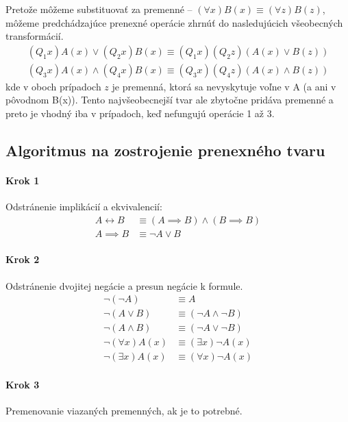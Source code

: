 Pretože môžeme substituovať za premenné --
    $(\forall x) B(x) \equiv (\forall z) B(z)$, môžeme predchádzajúce
prenexné operácie zhrnúť do nasledujúcich všeobecných transformácií.
\begin{align*}
    (Q_1 x)A(x) \lor (Q_2 x)B(x) \equiv 
        (Q_1 x)(Q_2 z)(A(x) \lor B(z)) \tag{4a} \\
    (Q_3 x)A(x) \land (Q_4 x)B(x) \equiv
        (Q_3 x)(Q_4 z)(A(x) \land B(z)) \tag{4b}
\end{align*} 
kde v oboch prípadoch $z$ je premenná, ktorá sa nevyskytuje voľne v A
(a ani v pôvodnom B(x)).
Tento najvšeobecnejší tvar ale zbytočne pridáva premenné a preto je
vhodný iba v prípadoch, keď nefungujú operácie 1 až 3.
\subsection{Algoritmus na zostrojenie prenexného tvaru}
\startFIXME
\paragraph{Krok 1}
Odstránenie implikácií a ekvivalencií:
\begin{align*}
    A \leftrightarrow B &\equiv (A \implies B) \land (B \implies B) \\
    A \implies B &\equiv \neg A \lor B
\end{align*}

\paragraph{Krok 2}
Odstránenie dvojitej negácie a presun negácie k formule.
\begin{align*}
    \neg (\neg A) &\equiv A \\
    \neg (A \lor B) &\equiv (\neg A \land \neg B) \\
    \neg (A \land B) &\equiv (\neg A \lor \neg B) \\
    \neg (\forall x) A(x) &\equiv (\exists x) \neg A(x) \\
    \neg (\exists x) A(x) &\equiv (\forall x) \neg A(x)
\end{align*}

\paragraph{Krok 3}
Premenovanie viazaných premenných, ak je to potrebné.

